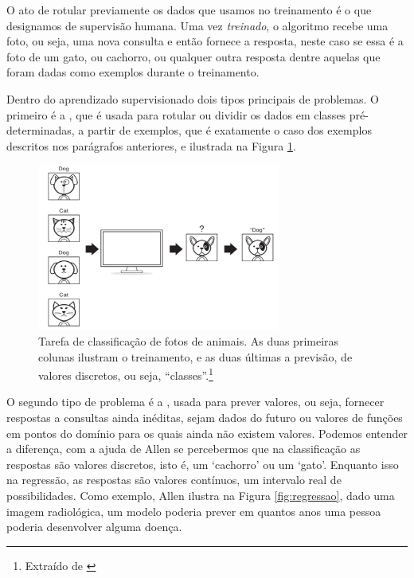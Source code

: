 O ato de rotular previamente os dados que usamos no treinamento é o que designamos de supervisão humana. Uma vez \emph{treinado}, o algoritmo recebe uma foto, ou seja, uma nova consulta e então fornece a resposta, neste caso se essa é a foto de um gato, ou cachorro, ou qualquer outra resposta dentre aquelas que foram dadas como exemplos durante o treinamento.

Dentro do aprendizado supervisionado dois tipos principais de problemas. O primeiro é a , que é usada para rotular ou dividir os dados em classes pré-determinadas, a partir de exemplos, que é exatamente o caso dos exemplos descritos nos parágrafos anteriores, e ilustrada na Figura \ref{fig:classify}.

\begin{figure}[htb]
\centering
\includegraphics[width=8cm]{figuras/classificacao}
\caption{Tarefa de classificação de fotos de animais. As duas primeiras colunas ilustram o treinamento, e as duas últimas a previsão, de valores discretos, ou seja, ``classes''.\footnote{Extraído de \citep{allen}}}
\label{fig:classify}
\end{figure}

O segundo tipo de problema é a , usada para prever valores, ou seja, fornecer respostas a consultas ainda inéditas, sejam dados do futuro ou valores de funções em pontos do domínio para os quais ainda não existem valores. Podemos entender a diferença, com a ajuda de Allen \citep{allen} se percebermos que na classificação as respostas são valores discretos, isto é, um `cachorro' ou um `gato'. Enquanto isso na regressão, as respostas são valores contínuos, um intervalo real de possibilidades. Como exemplo, Allen \citep{allen} ilustra na Figura \ref{fig:regressao}, dado uma imagem radiológica, um modelo poderia prever em quantos anos uma pessoa poderia desenvolver alguma doença.


